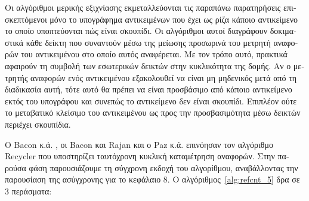 \begin{greek}
Οι αλγόριθμοι μερικής εξιχνίασης εκμεταλλεύονται τις παραπάνω
παρατηρήσεις επισκεπτόμενοι μόνο το υπογράφημα αντικειμένων
που έχει ως ρίζα κάποιο αντικείμενο το οποίο υποπτεύονται
πώς είναι σκουπίδι. Οι αλγόριθμοι αυτοί διαγράφουν δοκιμαστικά
κάθε δείκτη που συναντούν μέσω της μείωσης προσωρινά του
μετρητή αναφορών του αντικειμένου στο οποίο αυτός αναφέρεται.
Με τον τρόπο αυτό, πρακτικά αφαιρούν τη συμβολή των εσωτερικών
δεικτών στην κυκλικότητα της δομής. Αν ο μετρητής αναφορών ενός
αντικειμένου εξακολουθεί να είναι μη μηδενικός μετά από τη
διαδικασία αυτή, τότε αυτό θα πρέπει να είναι προσβάσιμο από
κάποιο αντικείμενο εκτός του υπογράφου και συνεπώς το αντικείμενο
δεν είναι σκουπίδι. Επιπλέον ούτε το μεταβατικό κλείσιμο του
αντικειμένου ως προς την προσβασιμότητα μέσω δεικτών περιέχει
σκουπίδια.

Ο Bacon κ.ά. \cite{DBLP:conf/pldi/BaconALRS01}, οι Bacon
και Rajan \cite{DBLP:conf/ecoop/BaconR01} και ο Paz κ.ά.
\cite{DBLP:journals/toplas/PazBKPR07} επινόησαν τον αλγόριθμο
Recycler που υποστηρίζει ταυτόχρονη κυκλική καταμέτρηση
αναφορών. Στην παρούσα φάση παρουσιάζουμε τη σύγχρονη εκδοχή
του αλγορίθμου, αναβάλλοντας την παρουσίαση της ασύγχρονης
για το κεφάλαιο 8. Ο αλγόριθμος~\ref{alg:refcnt_5} δρα σε
3 περάσματα:


\end{greek}
